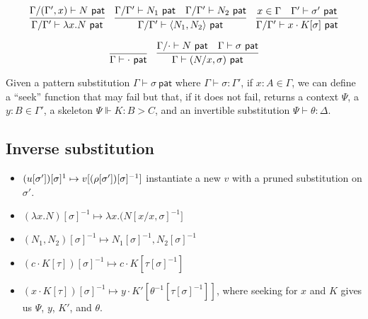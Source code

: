 \documentclass{article}
\begin{document}
\newcommand{\pat}{\mathsf{~pat}}

\[
\infer
{\Gamma / \Gamma' \vdash \lambda x.N \pat}
{\Gamma / (\Gamma', x) \vdash N \pat}
\quad
\infer
{\Gamma / \Gamma' \vdash \langle N_1, N_2 \rangle \pat}
{\Gamma / \Gamma' \vdash N_1 \pat & \Gamma / \Gamma' \vdash N_2 \pat}
\quad
\infer
{\Gamma / \Gamma' \vdash x \cdot K [ \sigma ] \pat}
{x \in \Gamma & \Gamma' \vdash \sigma' \pat}
\]

\[
\infer
{\Gamma \vdash \cdot \pat}{}
\quad
\infer
{\Gamma \vdash (N/x, \sigma) \pat}
{\Gamma / \cdot \vdash N \pat & \Gamma \vdash \sigma \pat}
\]

Given a pattern substitution $\Gamma \vdash \sigma \pat$ 
where $\Gamma \vdash \sigma : \Gamma'$, if 
$x : A \in \Gamma$, we can define  a ``seek'' function that may fail
but that, if it does not fail, returns a context $\Psi$, a $y : B \in \Gamma'$,
a skeleton $\Psi \Vdash K : B > C$, and an invertible substitution 
$\Psi \vdash \theta : \Delta$. 

\subsection{Inverse substitution}

\begin{itemize}
\item $(u [\sigma']) [\sigma]^{\-1} \mapsto v[(\rho[\sigma'])[\sigma]^{-1}]$ instantiate a new $v$ with  a pruned
substitution on $\sigma'$.
\item $(\lambda x.N)[\sigma]^{-1} \mapsto \lambda x. (N[x/x,\sigma]^{-1}]$
\item $(N_1, N_2)[\sigma]^{-1} \mapsto N_1 [\sigma]^{-1}, N_2 [\sigma]^{-1}$
\item $(c \cdot K [\tau])[\sigma]^{-1} \mapsto c \cdot K [\tau[\sigma]^{-1}]$
\item $(x \cdot K [\tau])[\sigma]^{-1} \mapsto y \cdot K' [ \theta^{-1} [\tau[\sigma]^{-1}]]$, where seeking for $x$ and $K$ gives us $\Psi$, $y$, $K'$, and $\theta$.
\end{itemize}
\end{document}
